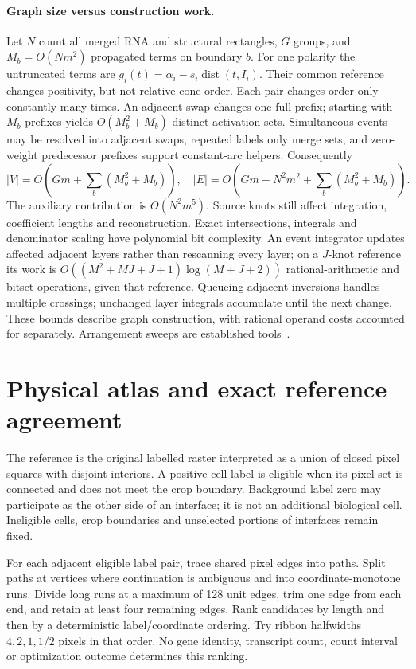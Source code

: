 \documentclass[10pt,letterpaper]{article}
\newcommand{\dist}{\operatorname{dist}}
\begin{document}
\paragraph{Graph size versus construction work.}
Let $N$ count all merged RNA and structural rectangles, $G$ groups, and $M_b=O(Nm^2)$ propagated terms on boundary $b$. For one polarity the untruncated terms are $g_i(t)=\alpha_i-s_i\dist(t,I_i)$. Their common reference changes positivity, but not relative cone order. Each pair changes order only constantly many times. An adjacent swap changes one full prefix; starting with $M_b$ prefixes yields $O(M_b^2+M_b)$ distinct activation sets. Simultaneous events may be resolved into adjacent swaps, repeated labels only merge sets, and zero-weight predecessor prefixes support constant-arc helpers. Consequently
\begin{equation}
|V|=O\!\left(Gm+\sum_b(M_b^2+M_b)\right),\quad
|E|=O\!\left(Gm+N^2m^2+\sum_b(M_b^2+M_b)\right).\label{eq:size}
\end{equation}
The auxiliary contribution is $O(N^2m^5)$. Source knots still affect integration, coefficient lengths and reconstruction. Exact intersections, integrals and denominator scaling have polynomial bit complexity. An event integrator updates affected adjacent layers rather than rescanning every layer; on a $J$-knot reference its work is $O((M^2+MJ+J+1)\log(M+J+2))$ rational-arithmetic and bitset operations, given that reference. Queueing adjacent inversions handles multiple crossings; unchanged layer integrals accumulate until the next change. These bounds describe graph construction, with rational operand costs accounted for separately. Arrangement sweeps are established tools~\cite{bentley}.


\section{Physical atlas and exact reference agreement}
The reference is the original labelled raster interpreted as a union of closed pixel squares with disjoint interiors. A positive cell label is eligible when its pixel set is connected and does not meet the crop boundary. Background label zero may participate as the other side of an interface; it is not an additional biological cell. Ineligible cells, crop boundaries and unselected portions of interfaces remain fixed.

For each adjacent eligible label pair, trace shared pixel edges into paths. Split paths at vertices where continuation is ambiguous and into coordinate-monotone runs. Divide long runs at a maximum of 128 unit edges, trim one edge from each end, and retain at least four remaining edges. Rank candidates by length and then by a deterministic label/coordinate ordering. Try ribbon halfwidths $4,2,1,1/2$ pixels in that order. No gene identity, transcript count, count interval or optimization outcome determines this ranking.
\end{document}
